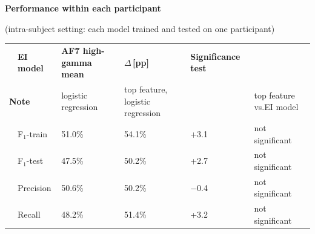 \begin{table}[H]
\centering
{}
\small
\renewcommand{\arraystretch}{1.12}
\setlength{\tabcolsep}{2pt}
{\raggedright\textbf{Performance within each participant}\par {\footnotesize\textcolor{headGray}{(intra-subject setting: each model trained and tested on one participant)}}\par}
\vspace{3pt}
\begin{tabularx}{\textwidth}{c l >{\centering\arraybackslash}p{2.5cm} >{\centering\arraybackslash}X >{\centering\arraybackslash}p{1.5cm}|>{\centering\arraybackslash}p{2.95cm}}
\arrayrulecolor{black}\hline
\multicolumn{2}{l}{\footnotesize\textbf{Metric}} & {\footnotesize\textbf{EI model}} & {\footnotesize\textbf{AF7 high-gamma mean}} & {\footnotesize\textbf{\(\Delta\)\,[pp]}} & {\footnotesize\textbf{Significance test}} \\
\multicolumn{2}{l}{{\scriptsize\textcolor{headGray}{\textbf{Note}}}} & {\scriptsize\textcolor{headGray}{logistic regression}} & {\scriptsize\textcolor{headGray}{top feature, logistic regression}} &  & {\scriptsize\textcolor{headGray}{top feature vs.\newline EI model}} \\
\hline
\cellcolor{classBox} & \textcolor{nsGray}{F\(_1\)-train} & \textcolor{nsGray}{51.0\%} & \textcolor{nsGray}{54.1\%} & \textcolor{nsGray}{+3.1} & {\footnotesize\textcolor{nsGray}{not significant}} \\
\arrayrulecolor{ruleGray}\cline{2-6}
\cellcolor{classBox} & \textcolor{nsGray}{F\(_1\)-test} & \textcolor{nsGray}{47.5\%} & \textcolor{nsGray}{50.2\%} & \textcolor{nsGray}{+2.7} & {\footnotesize\textcolor{nsGray}{not significant}} \\
\arrayrulecolor{ruleGray}\cline{2-6}
\cellcolor{classBox} & \textcolor{nsGray}{Precision} & \textcolor{nsGray}{50.6\%} & \textcolor{nsGray}{50.2\%} & \textcolor{nsGray}{\(-\)0.4} & {\footnotesize\textcolor{nsGray}{not significant}} \\
\arrayrulecolor{ruleGray}\cline{2-6}
\cellcolor{classBox}\multirow{-4}{*}{\rotatebox[origin=c]{90}{\texttt{STAY}}} & \textcolor{nsGray}{Recall} & \textcolor{nsGray}{48.2\%} & \textcolor{nsGray}{51.4\%} & \textcolor{nsGray}{+3.2} & {\footnotesize\textcolor{nsGray}{not significant}} \\

\end{tabularx}
\end{table}
